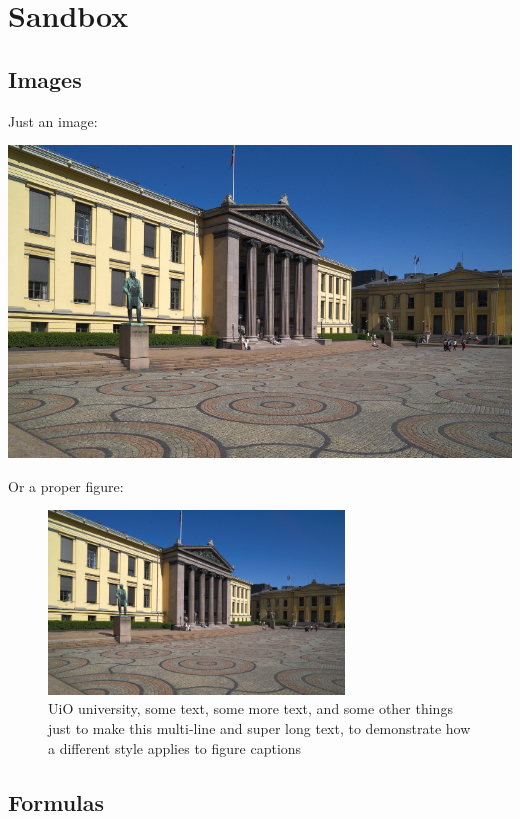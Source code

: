 \section{Sandbox}

\subsection{Images}

Just an image:

\begin{center}
    \includegraphics[width=0.7\columnwidth]{./img/university-square-uio.jpg}
\end{center}

Or a proper figure:

\begin{figure}[ht]
    \centering
    \includegraphics[width=0.7\textwidth]{./img/university-square-uio.jpg}
    \caption{UiO university, some text, some more text, and some other things just to make this multi-line and super long text, to demonstrate how a different style applies to figure captions}
    \label{fig:uio-university}
\end{figure}

\subsection{Formulas}

